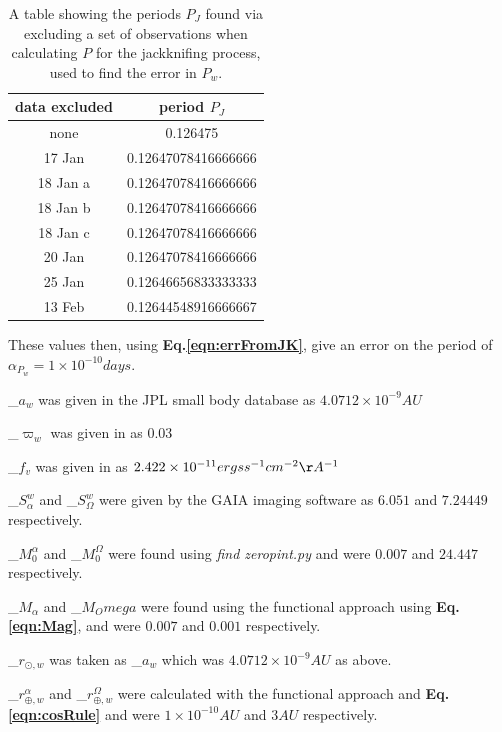\documentclass[10pt,twocolumn]{revtex4}    %
\newcommand*{\astrosun}{{\odot}}
\newcommand*{\earth}{{\oplus}}
\newcommand{\refeq}[1]{\textbf{Eq.#1}}
\newcommand{\rem}{r_{\earth,w}}
\newcommand{\rsm}{r_{\astrosun,w}}
\newcommand{\err}[1]{\alpha_{#1}}
\begin{document}
\begin{table}[h]
    \centering
    \begin{tabular}{c|c}
         data excluded & period $P_J$  \\\hline
         none       & 0.126475 \\
         17 Jan     & 0.12647078416666666 \\
         18 Jan a   & 0.12647078416666666 \\
         18 Jan b   & 0.12647078416666666 \\
         18 Jan c   & 0.12647078416666666\\
         20 Jan     & 0.12647078416666666\\
         25 Jan     & 0.12646656833333333\\
         13 Feb     & 0.12644548916666667\\
    \end{tabular}
    \caption{A table showing the periods $P_J$ found via excluding a set of observations when calculating $P$ for the jackknifing process, used to find the error in $P_w$.}
    \label{tab:jackP}
\end{table}

These values then, using \refeq{\ref{eqn:errFromJK}}, give an error on the period of $\err{P_w} = 1\times10^{-10}days$.

\err{$a_w$} was given in the JPL small body database as $4.0712\times10^{-9}AU$

\err{$\varpi_w$} was given in \cite{mitakaAlbedo} as $0.03$

\err{$f_v$} was given in \cite{VegaMag0} as $2.422\times10^{-11} ergs s^{-1} cm^{-2} \AA^{-1}$

\err{$S^w_\alpha$} and \err{$S^w_\Omega$} were given by the GAIA imaging software as $6.051$ and $7.24449$ respectively.

\err{$M_0^\alpha$} and \err{$M_0^\Omega$} were found using \textit{find \textunderscore zeropint.py} and were $0.007$ and $24.447$ respectively.

\err{$M_\alpha$} and \err{$M_Omega$} were found using the functional approach using \refeq{\ref{eqn:Mag}}, and were $0.007$ and $0.001$ respectively. 

\err{$\rsm$} was taken as \err{$a_w$} which was $4.0712\times10^{-9}AU$ as above.

\err{$\rem^\alpha$} and \err{$\rem^\Omega$} were calculated with the functional approach and \refeq{\ref{eqn:cosRule}} and were  $1\times10^{-10}AU$ and $3AU$ respectively.
\end{document}

